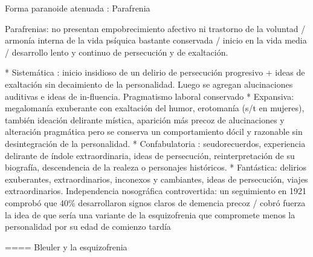 \documentclass[encares.tex]{subfiles}
\begin{document}
Forma paranoide atenuada : Parafrenia

Parafrenias: no presentan empobrecimiento afectivo ni trastorno de la voluntad / armonía interna de la vida psíquica bastante conservada / inicio en la vida media / desarrollo lento y continuo de persecución y de exaltación.

* Sistemática : inicio insidioso de un delirio de persecución progresivo + ideas de exaltación sin decaimiento de la personalidad. Luego se agregan alucinaciones auditivas e ideas de in-fluencia. Pragmatismo laboral conservado
* Expansiva: megalomanía exuberante con exaltación del humor, erotomanía (s/t en mujeres), también ideación delirante mística, aparición más precoz de alucinaciones y alteración pragmática pero se conserva un comportamiento dócil y razonable sin desintegración de la personalidad.
* Confabulatoria : seudorecuerdos, experiencia delirante de índole extraordinaria, ideas de persecución, reinterpretación de su biografía, descendencia de la realeza o personajes históricos.
* Fantástica: delirios exuberantes, extraordinarios, inconexos y cambiantes, ideas de persecución, viajes extraordinarios. Independencia nosográfica controvertida: un seguimiento en 1921 comprobó que 40\% desarrollaron signos claros de demencia precoz / cobró fuerza la idea de que sería una variante de la esquizofrenia que compromete menos la personalidad por su edad de comienzo tardía

==== Bleuler y la esquizofrenia
\end{document}
